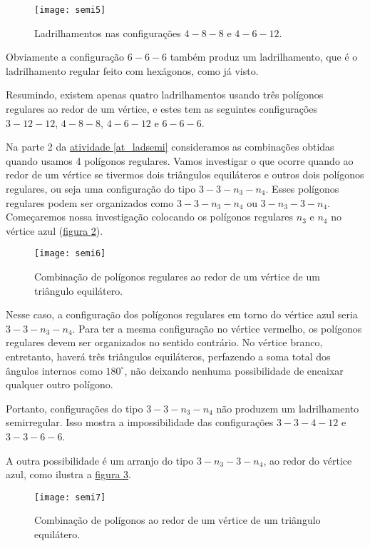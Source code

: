 \begin{figure}[H]
\centering
\texttt{[image: semi5]}
\caption{Ladrilhamentos nas configurações $4-8-8$ e $4-6-12$.}
\label{semi5}
\end{figure}

Obviamente a configuração $6-6-6$ também produz um ladrilhamento, que é o ladrilhamento regular feito com hexágonos, como já visto.

Resumindo, existem apenas quatro ladrilhamentos usando três polígonos regulares
ao redor de um vértice, e estes tem as seguintes configurações  $3-12-12$, $4-8-8$,  $4-6-12$  e $6-6-6$.

Na parte 2 da \hyperref[at_ladsemi]{atividade \ref{at_ladsemi}} consideramos as combinações obtidas quando usamos  4 polígonos regulares. 
Vamos investigar o que ocorre quando ao redor de um vértice se tivermos  dois triângulos equiláteros e outros dois polígonos regulares, ou seja uma configuração do tipo $3-3-n_3-n_4$. Esses polígonos regulares podem ser organizados como $3-3-n_3-n_4$ ou $3-n_3-3-n_4$. 
Começaremos nossa investigação colocando os polígonos regulares $n_3$ e $n_4$ no vértice azul (\hyperref[semi6]{figura \ref{semi6}}). 


\begin{figure}[H]
\centering
\texttt{[image: semi6]}
\caption{Combinação de polígonos regulares ao redor de um vértice de um triângulo equilátero.}
\label{semi6}
\end{figure}


Nesse caso, a configuração dos polígonos regulares em torno do vértice azul seria $3-3-n_3-n_4$. Para ter a mesma configuração no vértice vermelho, os polígonos regulares devem ser organizados no sentido contrário. No vértice branco, entretanto, haverá três triângulos equiláteros, perfazendo a soma total dos ângulos internos como $180^{\circ}$, não deixando nenhuma possibilidade de encaixar qualquer outro polígono. 

Portanto, configurações do tipo $3-3-n_3-n_4$ não produzem um ladrilhamento semirregular. Isso mostra a impossibilidade das configurações $3-3-4-12$ e $3-3-6-6$.

A outra possibilidade é um  arranjo do tipo $3-n_3-3-n_4$, ao redor do vértice azul, como ilustra a \hyperref[semi7]{figura \ref{semi7}}.



\begin{figure}[H]
\centering
\texttt{[image: semi7]}
\caption{Combinação de polígonos ao redor de um vértice de um triângulo equilátero.}
\label{semi7}
\end{figure}

